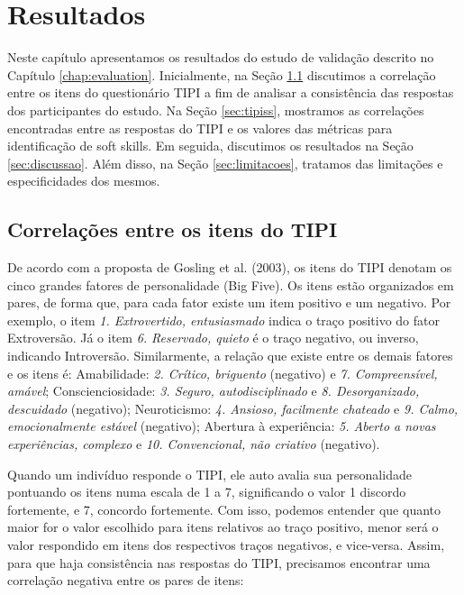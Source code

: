 

\chapter{Resultados}

\label{chap:results}

Neste capítulo apresentamos os resultados do estudo de validação descrito no Capítulo \ref{chap:evaluation}. Inicialmente, na Seção \ref{sec:tipitipi} discutimos a correlação entre os itens do questionário TIPI a fim de analisar a consistência das respostas dos participantes do estudo. Na Seção \ref{sec:tipiss}, mostramos as correlações encontradas entre as respostas do TIPI e os valores das métricas para identificação de soft skills. Em seguida, discutimos os resultados na Seção \ref{sec:discussao}. Além disso, na Seção \ref{sec:limitacoes}, tratamos das limitações e especificidades dos mesmos.

\section{Correlações entre os itens do TIPI}
\label{sec:tipitipi}

De acordo com a proposta de Gosling et al. (2003)\nocite{gosling:03}, os itens do TIPI denotam os cinco grandes fatores de personalidade (Big Five). Os itens estão organizados em pares, de forma que,
para cada fator existe um item positivo e um negativo.
Por exemplo, o item \textit{1. Extrovertido, entusiasmado} indica o traço positivo do fator Extroversão. Já o item \textit{6. Reservado, quieto} é o traço negativo, ou inverso, indicando Introversão.
Similarmente, a relação que existe entre os demais fatores e os itens é:
Amabilidade: \textit{2. Crítico, briguento} (negativo) e \textit{7. Compreensível, amável}; 
Conscienciosidade: \textit{3. Seguro, autodisciplinado} e \textit{8. Desorganizado, descuidado} (negativo);
Neuroticismo: \textit{4. Ansioso, facilmente chateado} e \textit{9. Calmo, emocionalmente estável} (negativo);
Abertura à experiência: \textit{5. Aberto a novas experiências, complexo} e \textit{10. Convencional, não criativo} (negativo).

Quando um indivíduo responde o TIPI, ele auto avalia sua personalidade pontuando os itens numa escala de 1 a 7, significando o valor 1 discordo fortemente, e 7, concordo fortemente.
Com isso, podemos entender que quanto maior for o valor escolhido para itens relativos ao traço positivo, menor será o valor respondido em itens dos respectivos traços negativos, e vice-versa.
Assim, para que haja consistência nas respostas do TIPI, precisamos encontrar uma correlação negativa entre os pares de itens:

